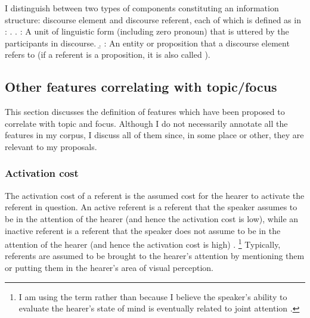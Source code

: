 
I distinguish between two types of components constituting an information structure:
discourse element and discourse referent,
each of which is defined as in \Next:
\ex.
	\a. : {A unit of linguistic form (including zero pronoun) that is uttered by the participants in discourse.}
	\b. : {An entity or proposition that a discourse element refers to (if a referent is a proposition, it is also called ).}



\subsection{Other features correlating with topic/focus}\label{FrameworkOthFeatures}

This section discusses the definition of features which have been
proposed to correlate with topic and focus.
Although I do not necessarily annotate all the features in my corpus,
I discuss all of them
since, in some place or other, they are relevant to my proposals.



\subsubsection{Activation cost}\label{FrameworkActivation}
The activation cost of a referent is the assumed cost for the hearer to activate the referent in question.
An active referent is a referent
that the speaker assumes to be in the attention of the hearer (and hence the activation cost is low),
while an inactive referent is a referent
that the speaker does not assume to be in the attention of the hearer (and hence the activation cost is high)
\cite[see also][inter alia]{chafe94}.%
	\footnote{
	I am using the term  rather than 
	because I believe the speaker's ability to evaluate the hearer's state of mind is eventually related to joint attention \cite{tomasello99}.
	}
Typically,
referents are assumed to be brought to the hearer's attention
by mentioning them or putting them in the hearer's area of visual perception.

